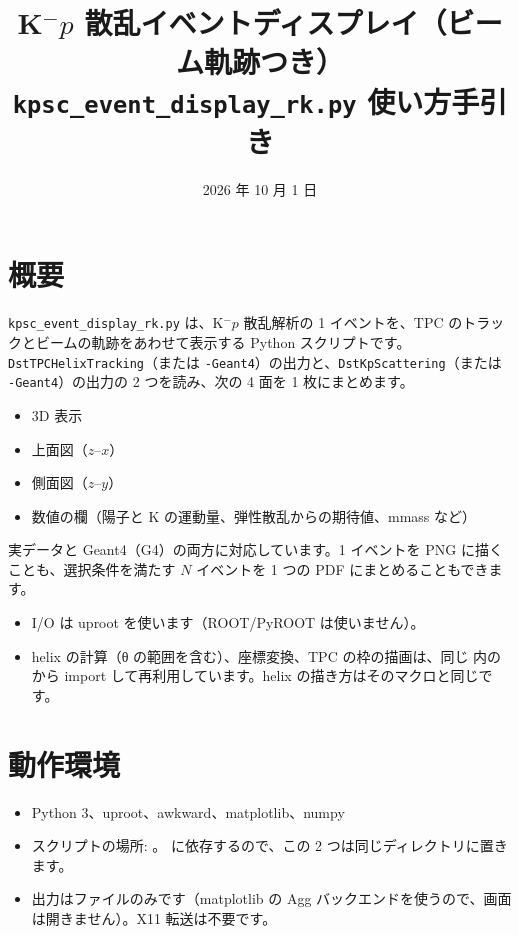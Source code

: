 \documentclass[a4paper,10pt]{ltjsarticle}
\title{K$^-p$ 散乱イベントディスプレイ（ビーム軌跡つき）\\
\large \texttt{kpsc\_event\_display\_rk.py} 使い方手引き}
\date{2026 年 10 月 1 日}
\begin{document}
\maketitle

\section{概要}
\texttt{kpsc\_event\_display\_rk.py} は、K$^-p$ 散乱解析の 1 イベントを、TPC のトラックとビームの軌跡をあわせて表示する Python スクリプトです。
\texttt{DstTPCHelixTracking}（または \texttt{-Geant4}）の出力と、\texttt{DstKpScattering}（または \texttt{-Geant4}）の出力の 2 つを読み、次の 4 面を 1 枚にまとめます。
\begin{itemize}
\item 3D 表示
\item 上面図（$z$–$x$）
\item 側面図（$z$–$y$）
\item 数値の欄（陽子と K の運動量、弾性散乱からの期待値、mmass など）
\end{itemize}
実データと Geant4（G4）の両方に対応しています。1 イベントを PNG に描くことも、選択条件を満たす $N$ イベントを 1 つの PDF にまとめることもできます。

\begin{itemize}
\item I/O は uproot を使います（ROOT/PyROOT は使いません）。
\item helix の計算（θ の範囲を含む）、座標変換、TPC の枠の描画は、同じ  内の  から import して再利用しています。helix の描き方はそのマクロと同じです。
\end{itemize}

\section{動作環境}
\begin{itemize}
\item Python 3、uproot、awkward、matplotlib、numpy
\item スクリプトの場所: 。 に依存するので、この 2 つは同じディレクトリに置きます。
\item 出力はファイルのみです（matplotlib の Agg バックエンドを使うので、画面は開きません）。X11 転送は不要です。
\end{itemize}
\end{document}
